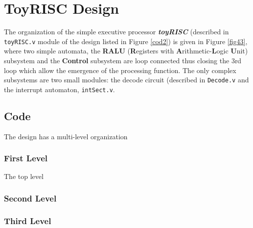 \chapter{ToyRISC Design}\label{toyRiscDesign}


The organization of the simple executive processor {\bf {\em toyRISC}} (described in {\tt toyRISC.v} module of the design listed in Figure \ref{cod2}) is given in Figure \ref{fig43}, where two simple automata, the {\bf RALU} ({\bf R}egisters with {\bf A}rithmetic-{\bf L}ogic {\bf U}nit)
subsystem  and  the {\bf Control} subsystem  are loop connected thus closing the 3rd loop which allow the emergence of the processing function. The only complex subsystems are two small modules: the decode circuit (described in {\tt Decode.v} and the interrupt automaton, {\tt intSect.v}.

\section{Code}

The design has a multi-level organization

\subsection{First Level}

The top level


\subsection{Second Level}



\subsection{Third Level}







